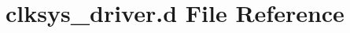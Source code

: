 \hypertarget{clksys__driver_8d}{}\section{clksys\+\_\+driver.\+d File Reference}
\label{clksys__driver_8d}
